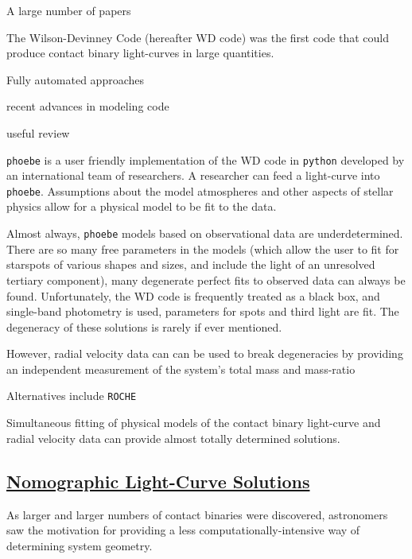 \documentclass[12pt]{article} %
\numberwithin{equation}{section} %
\begin{document}
A large number of papers 

The Wilson-Devinney Code (hereafter WD code)  was the first code that could produce contact binary light-curves in large quantities. 

Fully automated approaches \citep{prsa2009fully} \citep{prsa2008artificial}

recent advances in modeling code \citep{prvsa2013physics}

useful review \citep{gimenez2006close}

\texttt{phoebe} is a user friendly implementation of the WD code in \texttt{python} developed by an international team of researchers. A researcher can feed a light-curve into \texttt{phoebe}. Assumptions about the model atmospheres and other aspects of stellar physics allow for a physical model to be fit to the data.

Almost always, \texttt{phoebe} models based on observational data are underdetermined. There are so many free parameters in the models (which allow the user to fit for starspots of various shapes and sizes, and include the light of an unresolved tertiary component), many degenerate perfect fits to observed data can always be found. Unfortunately, the WD code is frequently treated as a black box, and single-band photometry is used, parameters for spots and third light are fit. The degeneracy of these solutions is rarely if ever mentioned. 

However, radial velocity data can can be used to break degeneracies by providing an independent measurement of the system's total mass and mass-ratio 

Alternatives include \texttt{ROCHE}  \citep{pribulla2012roche}

Simultaneous fitting of physical models of the contact binary light-curve and radial velocity data can provide almost totally determined solutions. 

\subsection[Nomographic Light-Curve Solutions]{\hyperlink{toc}{Nomographic Light-Curve Solutions}} \label{sec: Nomographic Light-Curve Solutions}

As larger and larger numbers of contact binaries were discovered, astronomers saw the motivation for providing a less computationally-intensive way of determining system geometry. 
\end{document}
